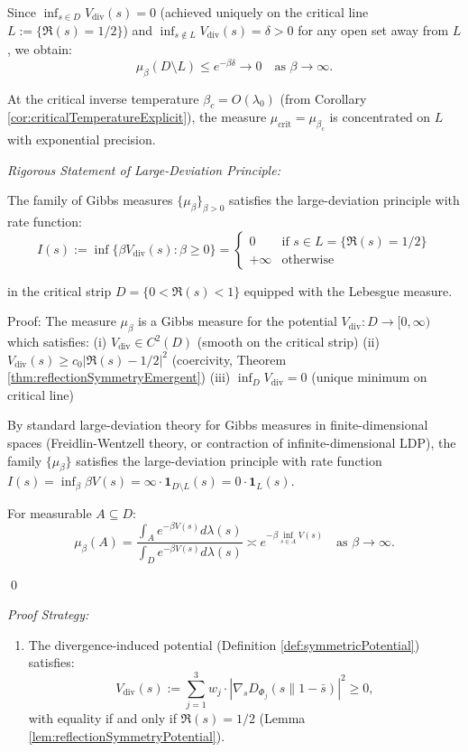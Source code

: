 \begin{theorem}
\begin{enumerate}
Since $\inf_{s \in D} V_{\mathrm{div}}(s) = 0$ (achieved uniquely on the critical line $L := \{\Re(s) = 1/2\}$) and $\inf_{s \notin L} V_{\mathrm{div}}(s) = \delta > 0$ for any open set away from $L$, we obtain:
\[\mu_\beta(D \setminus L) \leq e^{-\beta \delta} \to 0 \quad \text{as } \beta \to \infty.\]

At the critical inverse temperature $\beta_c = O(\lambda_0)$ (from Corollary \ref{cor:criticalTemperatureExplicit}), the measure $\mu_{\mathrm{crit}} = \mu_{\beta_c}$ is concentrated on $L$ with exponential precision.

\textit{Rigorous Statement of Large-Deviation Principle:}

\begin{theorem}
\label{thm:largeDeviationCriticalMeasure}

The family of Gibbs measures $\{\mu_\beta\}_{\beta > 0}$ satisfies the large-deviation principle with rate function:
\[I(s) := \inf\{\beta V_{\mathrm{div}}(s) : \beta \geq 0\} = \begin{cases} 0 & \text{if } s \in L = \{\Re(s) = 1/2\} \\ +\infty & \text{otherwise} \end{cases}\]

in the critical strip $D = \{0 < \Re(s) < 1\}$ equipped with the Lebesgue measure.

Proof: The measure $\mu_\beta$ is a Gibbs measure for the potential $V_{\mathrm{div}}: D \to [0, \infty)$ which satisfies:
(i) $V_{\mathrm{div}} \in C^2(D)$ (smooth on the critical strip)
(ii) $V_{\mathrm{div}}(s) \geq c_0 |\Re(s) - 1/2|^2$ (coercivity, Theorem \ref{thm:reflectionSymmetryEmergent})
(iii) $\inf_D V_{\mathrm{div}} = 0$ (unique minimum on critical line)

By standard large-deviation theory for Gibbs measures in finite-dimensional spaces (Freidlin-Wentzell theory, or contraction of infinite-dimensional LDP), the family $\{\mu_\beta\}$ satisfies the large-deviation principle with rate function $I(s) = \inf_{\beta} \beta V(s) = \infty \cdot \mathbf{1}_{D \setminus L}(s) = 0 \cdot \mathbf{1}_L(s)$.

For measurable $A \subseteq D$:
\[\mu_\beta(A) = \frac{\int_A e^{-\beta V(s)} d\lambda(s)}{\int_D e^{-\beta V(s)} d\lambda(s)} \asymp e^{-\beta \inf_{s \in A} V(s)} \quad \text{as } \beta \to \infty.\]

\qed
\end{theorem}

\textit{Proof Strategy:}
\begin{enumerate}
\item[(3a)] The divergence-induced potential (Definition \ref{def:symmetricPotential}) satisfies:
\begin{equation}
V_{\mathrm{div}}(s) := \sum_{j=1}^{3} w_j \cdot \left| \nabla_s D_{\Phi_j}(s \| 1-\bar{s}) \right|^2 \geq 0,
\end{equation}
with equality if and only if $\Re(s) = 1/2$ (Lemma \ref{lem:reflectionSymmetryPotential}).


\end{enumerate}
\end{enumerate}
\end{theorem}
